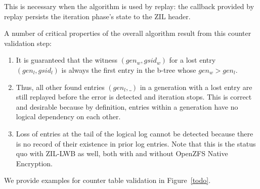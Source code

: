 \documentclass[12pt,a4paper,twoside]{book}
\begin{document}
This is necessary when the algorithm is used by replay: the callback provided by replay persists the iteration phase's state to the ZIL header.



A number of critical properties of the overall algorithm result from this counter validation step:
\begin{enumerate}[noitemsep]
    \item It is guaranteed that the witness $(gen_w, gsid_w)$ for a lost entry $(gen_l, gsid_l)$ is always the first entry in the b-tree whose $gen_w > gen_l$.
    \item Thus, all other found entries $(gen_l,  \_)$ in a generation with a lost entry are still replayed before the error is detected and iteration stops.
    This is correct and desirable because by definition, entries within a generation have no logical dependency on each other.
    \item Loss of entries at the tail of the logical log cannot be detected because there is no record of their existence in prior log entries.
    Note that this is the status quo with ZIL-LWB as well, both with and without OpenZFS Native Encryption.
\end{enumerate}
We provide examples for counter table validation in Figure~\ref{todo}.
\end{document}
